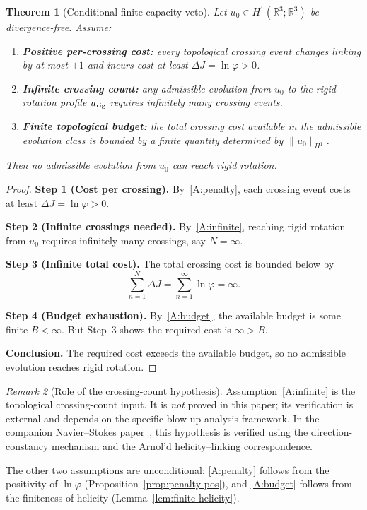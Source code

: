 \documentclass[11pt]{amsart}
\newtheorem{theorem}{Theorem}[section]
\theoremstyle{definition}
\theoremstyle{remark}
\newtheorem{remark}[theorem]{Remark}
\newcommand{\R}{\mathbb{R}}
\begin{document}
\begin{theorem}[Conditional finite-capacity veto]\label{thm:veto}
Let $u_0\in H^1(\R^3;\R^3)$ be divergence-free.  Assume:
\begin{enumerate}[label=\textup{(A\arabic*)},nosep]
\item\label{A:penalty}
  \textbf{Positive per-crossing cost:} every topological crossing event
  changes linking by at most $\pm 1$ and incurs cost at least
  $\Delta J=\ln\varphi>0$.
\item\label{A:infinite}
  \textbf{Infinite crossing count:} any admissible evolution from $u_0$
  to the rigid rotation profile $u_{\rm rig}$ requires infinitely many
  crossing events.
\item\label{A:budget}
  \textbf{Finite topological budget:} the total crossing cost available
  in the admissible evolution class is bounded by a finite quantity
  determined by $\|u_0\|_{H^1}$.
\end{enumerate}
Then no admissible evolution from $u_0$ can reach rigid rotation.
\end{theorem}
\begin{proof}
\textbf{Step 1 (Cost per crossing).}
By~\ref{A:penalty}, each crossing event costs at least
$\Delta J=\ln\varphi>0$.

\textbf{Step 2 (Infinite crossings needed).}
By~\ref{A:infinite}, reaching rigid rotation from $u_0$ requires
infinitely many crossings, say $N=\infty$.

\textbf{Step 3 (Infinite total cost).}
The total crossing cost is bounded below by
\[
\sum_{n=1}^N \Delta J
=\sum_{n=1}^\infty \ln\varphi
=\infty.
\]

\textbf{Step 4 (Budget exhaustion).}
By~\ref{A:budget}, the available budget is some finite $B<\infty$.
But Step~3 shows the required cost is $\infty>B$.

\textbf{Conclusion.}
The required cost exceeds the available budget, so no admissible
evolution reaches rigid rotation.
\end{proof}

\begin{remark}[Role of the crossing-count hypothesis]\label{rem:crossing}
Assumption~\ref{A:infinite} is the topological crossing-count input.
It is \emph{not} proved in this paper; its verification is external
and depends on the specific blow-up analysis framework.
In the companion Navier--Stokes paper~\cite{NS}, this hypothesis is
verified using the direction-constancy mechanism and the Arnol'd
helicity--linking correspondence.

The other two assumptions are unconditional:
\ref{A:penalty} follows from the positivity of $\ln\varphi$
(Proposition~\ref{prop:penalty-pos}), and
\ref{A:budget} follows from the finiteness of helicity
(Lemma~\ref{lem:finite-helicity}).
\end{remark}
\end{document}
